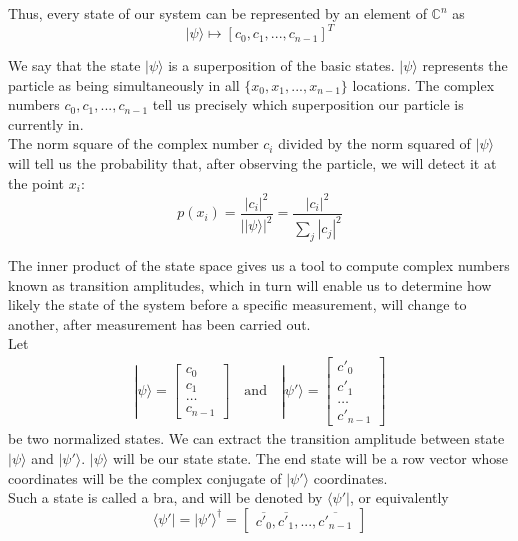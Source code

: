 \documentclass{article}
\begin{document}
Thus, every state of our system can be represented by an element of $\mathbb{C}^n$ as
\begin{equation}
    |\psi\rangle \longmapsto [c_{0}, c_{1}, ..., c_{n-1}]^T
\end{equation}
	

We say that the state $|\psi\rangle$ is a superposition of the basic states. $|\psi\rangle$ represents the particle as being simultaneously in all $\{x_{0}, x_{1}, ..., x_{n-1}\}$ locations. 
The complex numbers $c_{0}, c_{1}, ..., c_{n-1}$ tell us precisely which superposition our particle is currently in.\\

The norm square of the complex number $c_{i}$ divided by the norm squared of $|\psi\rangle$ will tell us the probability that, after observing the particle, we will detect it at the point $x_{i}$:
\begin{equation}
    p(x_i) = \frac{|c_i|^2}{||\psi\rangle|^2} = \frac{|c_i|^2}{\sum_{j}|c_j|^2}
\end{equation}

The inner product of the state space gives us a tool to compute complex numbers known as transition amplitudes, which in turn will enable us to determine how likely the state of the system before a specific measurement, will change to another, after measurement has been carried out.\\

Let 
\begin{gather}
|\psi\rangle = \begin{bmatrix}c_0\\c_1\\\ldots\\c_{n-1}\end{bmatrix}
\quad\text{and}\quad 
|\psi'\rangle = \begin{bmatrix}c'_0\\c'_1\\\ldots\\c'_{n-1}\end{bmatrix}
\end{gather}
be two normalized states. We can extract the transition amplitude between state $|\psi\rangle$ and $|\psi'\rangle$. $|\psi\rangle$ will be our state state. The end state will be a row vector whose coordinates will be the complex conjugate of $|\psi'\rangle$ coordinates.\\
Such a state is called a bra, and will be denoted by $\langle\psi'|$, or equivalently
\begin{equation}
\langle\psi'| = |\psi'\rangle^\dagger = 
\begin{bmatrix}\overline{c'_0}, \overline{c'_1}, ..., \overline{c'_{n-1}}\end{bmatrix}
\end{equation}
\end{document}
